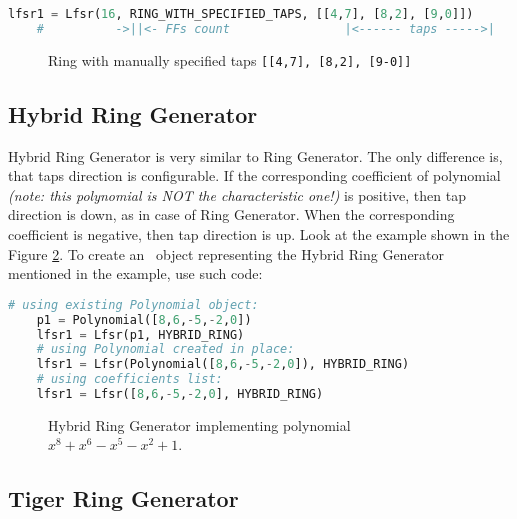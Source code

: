 \begin{lstlisting}[language=Python]
	lfsr1 = Lfsr(16, RING_WITH_SPECIFIED_TAPS, [[4,7], [8,2], [9,0]])
	#          ->||<- FFs count                |<------ taps ----->|
\end{lstlisting}

\begin{figure}[h]
	\centering
	\scalebox{.75}{}
	\caption{Ring with manually specified taps \texttt{[[4,7], [8,2], [9-0]]}}
	\label{lfsr:ringspecified}
\end{figure}

\label{lfsr:hybrid}
\subsection{Hybrid Ring Generator}


Hybrid Ring Generator is very similar to Ring Generator. The only difference is, that taps direction is configurable. If the corresponding coefficient of polynomial \textit{(note: this polynomial is NOT the characteristic one!)} is positive, then tap direction is down, as in case of Ring Generator. When the corresponding coefficient is negative, then tap direction is up. Look at the example shown in the Figure \ref{lfsr:hybridring}. To create an \Lfsr\ object representing the Hybrid Ring Generator mentioned in the example, use such code:

\begin{lstlisting}[language=Python]
	# using existing Polynomial object:
	p1 = Polynomial([8,6,-5,-2,0])
	lfsr1 = Lfsr(p1, HYBRID_RING)
	# using Polynomial created in place:
	lfsr1 = Lfsr(Polynomial([8,6,-5,-2,0]), HYBRID_RING)
	# using coefficients list:
	lfsr1 = Lfsr([8,6,-5,-2,0], HYBRID_RING)
\end{lstlisting}

\begin{figure}[h]
	\centering
	\scalebox{.75}{}
	\caption{Hybrid Ring Generator implementing polynomial $x^8+x^6-x^5-x^2+1$.}
	\label{lfsr:hybridring}
\end{figure}

\label{lfsr:tiger}
\subsection{Tiger Ring Generator}


